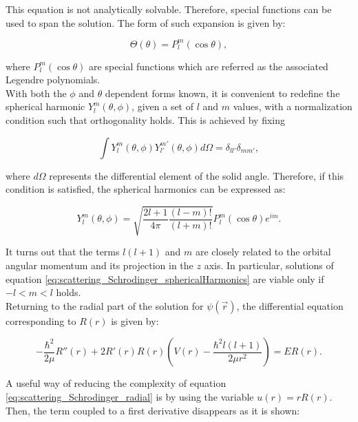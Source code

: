 \documentclass[openany]{book}
\begin{document}
This equation is not analytically solvable. Therefore, special functions can be used to span the solution. The form of such expansion is given by: 

\begin{equation}\label{eq:scattering_Schrodinger_polar_solution}
	\Theta(\theta) = P_l^{m}(\cos \theta), 
\end{equation}

where $P_l^{m}(\cos \theta)$ are special functions which are referred as the associated Legendre polynomials. \\

With both the $\phi$ and $\theta$ dependent forms known, it is convenient to redefine the spherical harmonic $	Y_{l}^{m}(\theta, \phi)$, given a set of $l$ and $m$ values, with a normalization condition such that orthogonality holds. This is achieved by fixing

\begin{equation}
	\int {Y_{l}^{m}(\theta, \phi) Y_{l'}^{m'}(\theta, \phi) d \Omega} = \delta_{ll'}\delta_{mm'},
\end{equation}

where $d\Omega$ represents the differential element of the solid angle. Therefore, if this condition is satisfied, the spherical harmonics can be expressed as:

\begin{equation}\label{eq:scattering_Schrodinger_sphericalHarmonics}
	Y_{l}^{m}(\theta, \phi) = \sqrt{\frac{2l + 1}{4 \pi} \frac{(l - m)!}{(l+m)!}}  P_l^{m}(\cos \theta) e^{im}. 
\end{equation}

It turns out that the terms $l(l+1)$ and $m$ are closely related to the orbital angular momentum and its projection in the $z$ axis. In particular, solutions of equation \ref{eq:scattering_Schrodinger_sphericalHarmonics} are viable only if $-l < m < l $ holds. \\

Returning to the radial part of the solution for $\psi(\vec r)$, the differential equation corresponding to $R(r)$ is given by:

\begin{equation}\label{eq:scattering_Schrodinger_radial}
	- \frac{\hbar^2}{2 \mu}R''(r)  + 2R'(r) R(r) \left( V(r)  - \frac{\hbar^2l(l+1)}{2 \mu r^2}  \right  ) = E R(r).
\end{equation}

A useful way of reducing the complexity of equation \ref{eq:scattering_Schrodinger_radial} is by using the variable $u(r) = rR(r)$. Then, the term coupled to a first derivative disappears as it is shown:  
\end{document}
